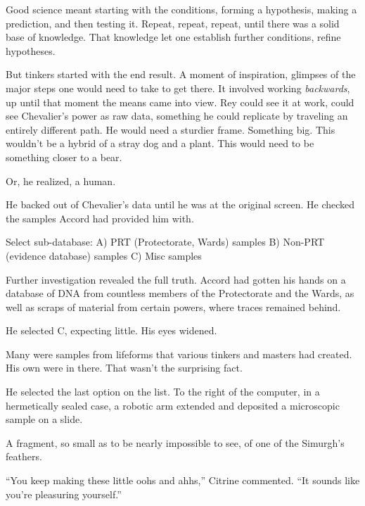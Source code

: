 Good science meant starting with the conditions, forming a hypothesis, making a prediction, and then testing it.  Repeat, repeat, repeat, until there was a solid base of knowledge.  That knowledge let one establish further conditions, refine hypotheses.



But tinkers started with the end result.  A moment of inspiration, glimpses of the major steps one would need to take to get there.  It involved working \emph{backwards}, up until that moment the means came into view.  Rey could see it at work, could see Chevalier's power as raw data, something he could replicate by traveling an entirely different path.  He would need a sturdier frame.  Something big.  This wouldn't be a hybrid of a stray dog and a plant.  This would need to be something closer to a bear.



Or, he realized, a human.



He backed out of Chevalier's data until he was at the original screen.  He checked the samples Accord had provided him with.



Select sub-database:
A)  PRT (Protectorate, Wards) samples
B) Non-PRT (evidence database) samples
C) Misc samples



Further investigation revealed the full truth.  Accord had gotten his hands on a database of DNA from countless members of the Protectorate and the Wards, as well as scraps of material from certain powers, where traces remained behind.



He selected C, expecting little.  His eyes widened.



Many were samples from lifeforms that various tinkers and masters had created.  His own were in there.  That wasn't the surprising fact.



He selected the last option on the list.  To the right of the computer, in a hermetically sealed case, a robotic arm extended and deposited a microscopic sample on a slide.



A fragment, so small as to be nearly impossible to see, of one of the Simurgh's feathers.



``You keep making these little oohs and ahhs,'' Citrine commented.  ``It sounds like you're pleasuring yourself.''



